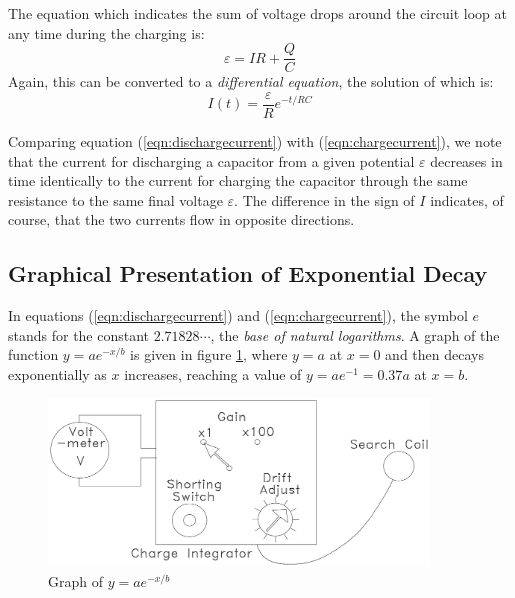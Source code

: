 The equation which indicates the sum of voltage drops around the circuit loop at any time during the charging is:
\begin{equation}
    \varepsilon = IR + \frac{Q}{C}
\end{equation}
Again, this can be converted to a \emph{differential equation}, the solution of which is:
\begin{equation}
    I(t) = \frac{\varepsilon}{R}e^{-t/RC}
    \label{eqn:chargecurrent}
\end{equation}

Comparing equation (\ref{eqn:dischargecurrent}) with (\ref{eqn:chargecurrent}), we note that the current for discharging a capacitor from a given potential $\varepsilon$ decreases in time identically to the current for charging the capacitor through the same resistance to the same final voltage $\varepsilon$. The difference in the sign of $I$ indicates, of course, that the two currents flow in opposite directions.

\subsection{Graphical Presentation of Exponential Decay}

In equations (\ref{eqn:dischargecurrent}) and (\ref{eqn:chargecurrent}), the symbol $e$ stands for the constant $2.71828\cdots$, the \emph{base of natural logarithms}. A graph of the function $y = ae^{-x/b}$ is given in figure \ref{fig:expgraph}, where $y=a$ at $x=0$ and then decays exponentially as $x$ increases, reaching a value of $y = ae^{-1} = 0.37a$ at $x=b$.

\begin{figure}[h]
    \begin{center}
        \includegraphics[width=0.9\textwidth]{./Exp4/pic/image4.png}
    \end{center}
    \caption{Graph of $y=ae^{-x/b}$}
    \label{fig:expgraph}
\end{figure}

